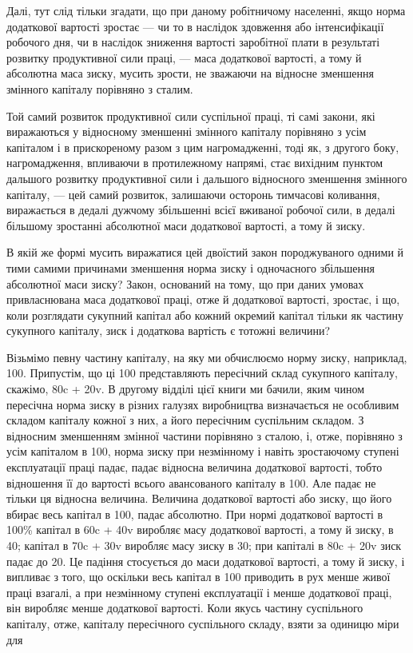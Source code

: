 Далі, тут слід тільки згадати, що при даному робітничому населенні,
якщо норма додаткової вартості зростає — чи то в наслідок
здовження або інтенсифікації робочого дня, чи в наслідок зниження
вартості заробітної плати в результаті розвитку продуктивної
сили праці, — маса додаткової вартості, а тому й абсолютна
маса зиску, мусить зрости, не зважаючи на відносне
зменшення змінного капіталу порівняно з сталим.

Той самий розвиток продуктивної сили суспільної праці, ті самі
закони, які виражаються у відносному зменшенні змінного капіталу
порівняно з усім капіталом і в прискореному разом з цим нагромадженні,
тоді як, з другого боку, нагромадження, впливаючи
в протилежному напрямі, стає вихідним пунктом дальшого розвитку
продуктивної сили і дальшого відносного зменшення змінного
капіталу, — цей самий розвиток, залишаючи осторонь тимчасові
коливання, виражається в дедалі дужчому збільшенні
всієї вживаної робочої сили, в дедалі більшому зростанні абсолютної
маси додаткової вартості, а тому й зиску.

В якій же формі мусить виражатися цей двоїстий закон породжуваного
одними й тими самими причинами зменшення норма
зиску і одночасного збільшення абсолютної маси зиску? Закон,
оснований на тому, що при даних умовах привласнювана маса
додаткової праці, отже й додаткової вартості, зростає, і що, коли
розглядати сукупний капітал або кожний окремий капітал тільки
як частину сукупного капіталу, зиск і додаткова вартість є тотожні
величини?

Візьмімо певну частину капіталу, на яку ми обчислюємо
норму зиску, наприклад, 100. Припустім, що ці 100 представляють
пересічний склад сукупного капіталу, скажімо, 80c + 20v.
В другому відділі цієї книги ми бачили, яким чином пересічна
норма зиску в різних галузях виробництва визначається не особливим
складом капіталу кожної з них, а його пересічним суспільним
складом. З відносним зменшенням змінної частини порівняно
з сталою, і, отже, порівняно з усім капіталом в 100, норма зиску
при незмінному і навіть зростаючому ступені експлуатації праці
падає, падає відносна величина додаткової вартості, тобто відношення
її до вартості всього авансованого капіталу в 100.
Але падає не тільки ця відносна величина. Величина додаткової
вартості або зиску, що його вбирає весь капітал в 100, падає
абсолютно. При нормі додаткової вартості в 100\% капітал в
60c + 40v виробляє масу додаткової вартості, а тому й зиску,
в 40; капітал в 70c + 30v виробляє масу зиску в  30; при капіталі
в 80c + 20v зиск падає до 20. Це падіння стосується до
маси додаткової вартості, а тому й зиску, і випливає з того,
що оскільки весь капітал в 100 приводить в рух менше живої
праці взагалі, а при незмінному ступені експлуатації
і менше додаткової праці, він виробляє менше додаткової вартості.
Коли якусь частину суспільного капіталу, отже, капіталу
пересічного суспільного складу, взяти за одиницю міри для
\parbreak{}  %
